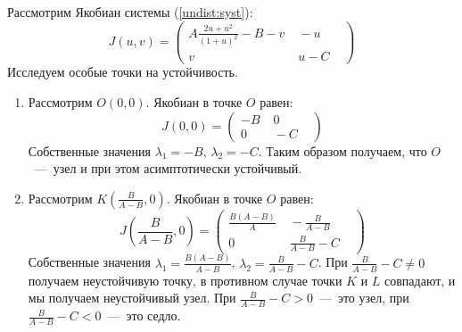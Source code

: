 \documentclass{article}
\begin{document}
Рассмотрим Якобиан системы (\ref{undist:syst}):
\begin{equation*}
J(u, v) = \begin{pmatrix} A \frac{2u + u^2}{(1 + u)^2} - B - v& \;  -u &\\ v &\; u- C &\end{pmatrix}
\end{equation*}
Исследуем особые точки на устойчивость.
\begin{enumerate}

\item Рассмотрим $O(0, 0)$. Якобиан в точке $O$ равен:
\begin{equation*}
J(0, 0) = \begin{pmatrix}  - B &\;  0 &\\ 0 &\; - C &\end{pmatrix}
\end{equation*}
Собственные значения $\lambda_1 = -B$, $\lambda_2 = -C$. Таким образом получаем, что $O$~---~узел и при этом асимптотически устойчивый.

\item Рассмотрим $K \left(\frac{B}{A-B}, 0\right)$. Якобиан в точке $O$ равен:
\begin{equation*}
J(\frac{B}{A-B}, 0) = \begin{pmatrix}  \frac{B (A -B)}{A} &\;  - \frac{B}{A - B} &\\ 0 &\; \frac{B}{A - B} - C &\end{pmatrix}
\end{equation*}
Собственные значения $\lambda_1 = \frac{B(A - B)}{A - B}$, $\lambda_2 = \frac{B}{A - B} - C$. При $\frac{B}{A - B} - C \neq 0$ получаем неустойчивую точку, в противном случае точки $K$ и $L$ совпадают, и мы получаем неустойчивый узел. При $\frac{B}{A - B} - C > 0$~---~это узел, при $\frac{B}{A - B} - C < 0$~---~это седло.


\end{enumerate}
\end{document}
